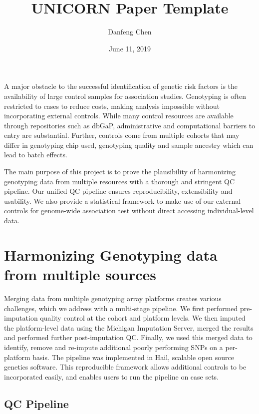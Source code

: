 \documentclass[12pt]{amsart}
\title{UNICORN Paper Template}
\author{Danfeng Chen}
\date{June 11, 2019} %
\begin{document}
\maketitle

A major obstacle to the successful identification of genetic risk factors is the availability of large control samples for association studies. Genotyping is often restricted to cases to reduce costs, making analysis impossible without incorporating external controls. While many control resources are available through repositories such as dbGaP, administrative and computational barriers to entry are substantial. Further, controls come from multiple cohorts that may differ in genotyping chip used, genotyping quality and sample ancestry which can lead to batch effects.

The main purpose of this project is to prove the plausibility of harmonizing genotyping data from multiple resources with a thorough and stringent QC pipeline. Our unified QC pipeline ensures reproducibility, extensibility and usability. We also provide a statistical framework to make use of our external controls for genome-wide association test without direct accessing individual-level data. 

\tableofcontents

\section{Harmonizing Genotyping data from multiple sources}

Merging data from multiple genotyping array platforms creates various challenges, which we address with a multi-stage pipeline. We first performed pre-imputation quality control at the cohort and platform levels. We then imputed the platform-level data using the Michigan Imputation Server, merged the results and performed further post-imputation QC. Finally, we used this merged data to identify, remove and re-impute additional poorly performing SNPs on a per-platform basis. The pipeline was implemented in Hail, scalable open source genetics software. This reproducible framework allows additional controls to be incorporated easily, and enables users to run the pipeline on case sets.

\subsection{QC Pipeline}
\end{document}
